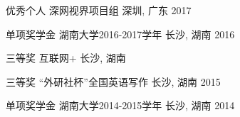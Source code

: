 \vspace{-1.5mm}
\begin{cvhonors}
\cvhonor
{优秀个人}
{深网视界项目组}
{深圳, 广东}
{2017}

\cvhonor
{单项奖学金}
{湖南大学2016-2017学年}
{长沙, 湖南}
{2016}

\cvhonor
{三等奖}
{互联网+}
{长沙, 湖南}
{}

\cvhonor
{三等奖}
{“外研社杯”全国英语写作}
{长沙, 湖南}
{2015}

\cvhonor
{单项奖学金}
{湖南大学2014-2015学年}
{长沙, 湖南}
{2014}
\end{cvhonors}
